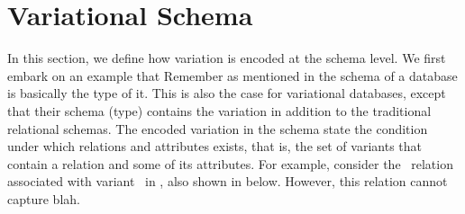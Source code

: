 \section{Variational Schema}
\label{sec:vsch}

%

In this section, we define how variation is encoded at the schema level. We first 
embark on an example that 
Remember as mentioned in  the schema of a database is basically
the type of it. This is also the case for variational databases, except that their 
schema (type) contains the variation in addition to the traditional relational schemas.
The encoded variation in the schema state the condition under which relations and
attributes exists, that is, the set of variants that contain a relation and some of its attributes.
%
For example, consider the \empbio\ relation associated with variant \vThree\ in ,
also shown in  below.
% 
However, this relation cannot capture blah.

